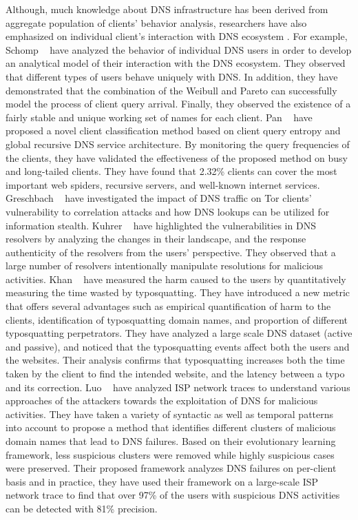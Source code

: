 Although, much  knowledge about DNS infrastructure has been derived from aggregate population of clients' behavior analysis, researchers have also emphasized on individual client's interaction with DNS ecosystem . For example, Schomp \etal~ have analyzed the behavior of individual DNS users in order to develop an analytical model of their interaction with the DNS ecosystem. They observed that different types of users behave uniquely with DNS. In addition, they have demonstrated that the combination of the Weibull and Pareto can successfully model the process of client query arrival. Finally, they observed the existence of a fairly stable and unique working set of names for each client.
Pan \etal~ have proposed a novel client classification method based on client query entropy and global recursive DNS service architecture. By monitoring the query frequencies of the clients, they have validated the effectiveness of the proposed method on busy and long-tailed clients. They have found that 2.32\% clients can cover the most important web spiders, recursive servers, and well-known internet services. Greschbach \etal~ have investigated the impact of DNS traffic on Tor clients' vulnerability to correlation attacks and how DNS lookups can be utilized for information stealth. 
Kuhrer \etal~ have highlighted the vulnerabilities in DNS resolvers by analyzing the changes in their landscape, and the response authenticity of the resolvers from the users' perspective. They observed that a large number of resolvers intentionally manipulate resolutions for malicious activities. 
Khan \etal~ have measured the harm caused to the users by quantitatively measuring the time wasted by typosquatting. They have introduced a new metric that offers several advantages such as empirical quantification of harm to the clients, identification of typosquatting domain names, and proportion of different typosquatting perpetrators. They have analyzed a large scale DNS dataset (active and passive), and noticed that the typosquatting events affect both the users and the websites. Their analysis confirms that typosquatting increases both the time taken by the client to find the intended website, and the latency between a typo and its correction.  
Luo \etal~ have analyzed ISP network traces to understand various approaches of the attackers towards the exploitation of DNS for malicious activities. They have taken a variety of syntactic as well as temporal patterns into account to propose a method that identifies different clusters of malicious domain names that lead to DNS failures. Based on their evolutionary learning framework, less suspicious clusters were removed while highly suspicious cases were preserved. Their proposed framework analyzes DNS failures on per-client basis and in practice, they have used their framework on a large-scale ISP network trace to find that over 97\% of the users with suspicious DNS activities can be detected with 81\% precision.
